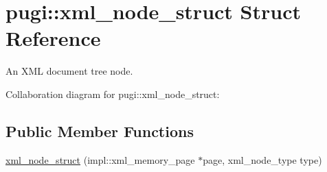 \hypertarget{structpugi_1_1xml__node__struct}{}\section{pugi\+:\+:xml\+\_\+node\+\_\+struct Struct Reference}
\label{structpugi_1_1xml__node__struct}


An X\+M\+L document tree node.  




Collaboration diagram for pugi\+:\+:xml\+\_\+node\+\_\+struct\+:
\subsection*{Public Member Functions}
\begin{DoxyCompactItemize}
\item 
\hyperlink{structpugi_1_1xml__node__struct_af9af20f835af8b6b99f9a39c93920ea6}{xml\+\_\+node\+\_\+struct} (impl\+::xml\+\_\+memory\+\_\+page $\ast$page, xml\+\_\+node\+\_\+type type)
\end{DoxyCompactItemize}
